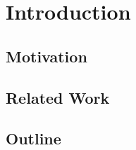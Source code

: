 \chapter{Introduction}
\label{ch:Introduction}

\section{Motivation}
\label{sec:Introduction:Motivation}

\section{Related Work}
\label{sec:Introduction:RelatedWork}

\section{Outline}
\label{sec:Introduction:Overview}
